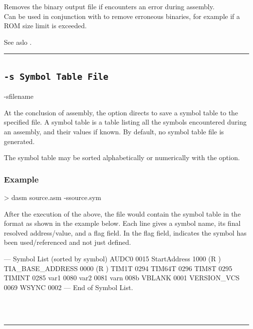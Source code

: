 \label{changelog:20200908optionR}
Removes the binary output file if \dasm encounters an error during assembly.\\

Can be used in conjunction with  to remove erroneous binaries, for example if a ROM size limit is exceeded.

See aslo .
\\


\hrule

\subsection{\texttt{-s Symbol Table File}}
\label{flag:symboltable}

\begin{usage}
-sfilename
\end{usage}

At the conclusion of assembly, the  option directs \dasm to save a symbol table to the specified file. A symbol table is a table listing all the symbols encountered during an assembly, and their values if known. By default, no symbol table file is generated.

The symbol table may be sorted alphabetically or numerically with the  option.


\subsubsection{Example}

\begin{outputx}
> dasm source.asm -ssource.sym
\end{outputx}

After the execution of the above, the file  would contain the symbol table in the format as shown in the example below. Each line gives a symbol name, its final resolved address/value, and a flag field. In the flag field,   indicates the symbol has been used/referenced and not just defined.

\begin{code}
--- Symbol List (sorted by symbol)
AUDC0                    0015                  
StartAddress             1000              (R )
TIA_BASE_ADDRESS         0000              (R )
TIM1T                    0294                  
TIM64T                   0296                  
TIM8T                    0295                  
TIMINT                   0285                  
var1                     0080                  
var2                     0081                  
varn                     008b                  
VBLANK                   0001                  
VERSION_VCS              0069                  
WSYNC                    0002                  
--- End of Symbol List.
\end{code}
\\
\\
\hrule

